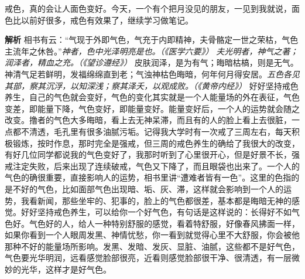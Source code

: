 \begin{case}
    戒色，真的会让人面色变好。今天，一个有个把月没见的朋友，一见到我就说，面色比以前好很多，戒色有效果了，继续学习做笔记。

    \textbf{解析} 相书有云：“气现于外即气色，气充于内即精神，夫骨骼定一世之荣枯，气色主流年之休咎。”\textit{神者，色中光泽明亮是也。（《医学六要》）} \textit{夫光明者，神气之著；润泽者，精血之充。（《望诊遵经》）} 皮肤润泽，是为有气；晦暗枯槁，则是无气。神清气足若鲜明，发福绵绵直到老；气浊神枯色晦暗，何年何月得安居。\textit{五色各见其部，察其沉浮，以知深浅；察其泽夭，以观成败。（《黄帝内经》）} 好好坚持戒色养生，自己的气色就会变好，气色的变化其实就是一个人能量场的外在表征，气色变差，即能量下降，气色变好，即能量变好。能量变好后，一个人的运势就会随之改变。撸者的气色大多晦暗，看上去无神呆滞，而且有的人的脸上看上去很脏，一点都不清透，毛孔里有很多油腻污垢。记得我大学时有一次戒了三周左右，每天积极锻炼，按时作息，那时完全是强戒，但三周的戒色养生的确给了我很大的改变，有好几位同学都说我的气色变好了，我那时听到了心里很开心，但是好景不长，强戒注定失败，后来出现了连续破戒，气色又下降了，而且眼袋也出来了。一个人的气色的确很重要，直接影响人的运势，相书里讲“遭难者皆有一色”。这里的色指的是不好的气色，比如面部气色出现暗、垢、灰、滞，这样就会影响到一个人的运势，我看新闻，那些坐牢的、犯事的，脸上的气色都很差，基本都是晦暗无神的感觉。好好坚持戒色养生，可以给你一个好气色，有句话是这样说的：长得好不如气色好。气色好的人，给人一种特别舒服的感觉，看着特舒服，好像春风拂面一样，如果你看到一个人眼周发黑、神情忧愁，你一看到就觉得心里不大舒服，你会被他那种不好的能量场所影响。发黑、发暗、发灰、显脏、油腻，这些都不是好气色，气色要光华明润，远看感觉脸部很亮，近看则感觉脸部很干净、很清透，有一层微妙的光华，这样才是好气色。
\end{case}

